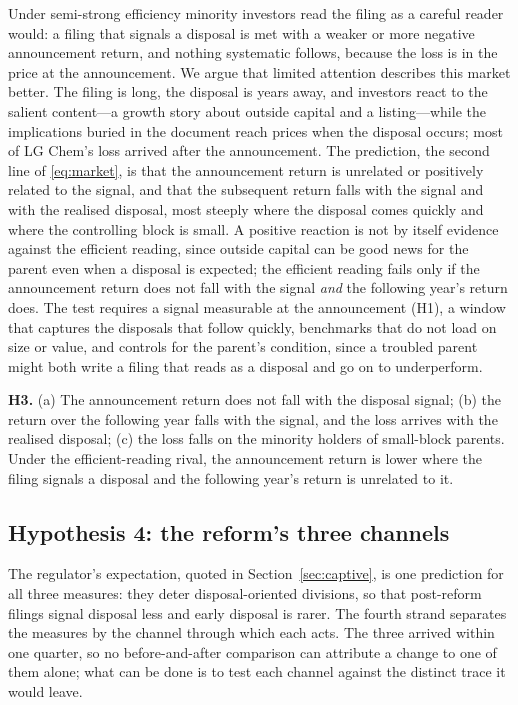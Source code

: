Under semi-strong efficiency minority investors read the filing as a careful reader would: a filing that signals a disposal is met with a weaker or more negative announcement return, and nothing systematic follows, because the loss is in the price at the announcement. We argue that limited attention describes this market better. The filing is long, the disposal is years away, and investors react to the salient content---a growth story about outside capital and a listing---while the implications buried in the document reach prices when the disposal occurs; most of LG Chem's loss arrived after the announcement. The prediction, the second line of \eqref{eq:market}, is that the announcement return is unrelated or positively related to the signal, and that the subsequent return falls with the signal and with the realised disposal, most steeply where the disposal comes quickly and where the controlling block is small. A positive reaction is not by itself evidence against the efficient reading, since outside capital can be good news for the parent even when a disposal is expected; the efficient reading fails only if the announcement return does not fall with the signal \emph{and} the following year's return does. The test requires a signal measurable at the announcement (H1), a window that captures the disposals that follow quickly, benchmarks that do not load on size or value, and controls for the parent's condition, since a troubled parent might both write a filing that reads as a disposal and go on to underperform.

\textbf{H3.} (a) The announcement return does not fall with the disposal signal; (b) the return over the following year falls with the signal, and the loss arrives with the realised disposal; (c) the loss falls on the minority holders of small-block parents. Under the efficient-reading rival, the announcement return is lower where the filing signals a disposal and the following year's return is unrelated to it.

\subsection{Hypothesis 4: the reform's three channels}\label{sec:h4}

The regulator's expectation, quoted in Section~\ref{sec:captive}, is one prediction for all three measures: they deter disposal-oriented divisions, so that post-reform filings signal disposal less and early disposal is rarer. The fourth strand separates the measures by the channel through which each acts. The three arrived within one quarter, so no before-and-after comparison can attribute a change to one of them alone; what can be done is to test each channel against the distinct trace it would leave.

